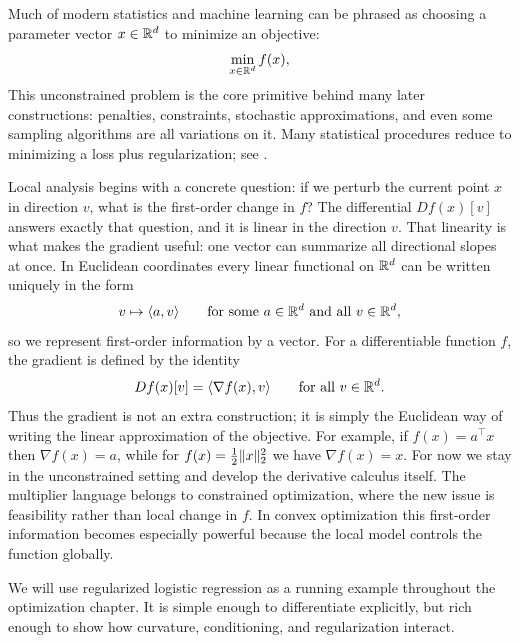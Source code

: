Much of modern statistics and machine learning can be phrased as choosing a parameter vector $x\in\mathbb{R}^d$ to minimize an objective:
\begin{equation}
  \min_{x \in \mathbb{R}^d} f(x),
  \label{eq:unconstrained-min}
\end{equation}
This unconstrained problem is the core primitive behind many later constructions: penalties, constraints, stochastic approximations, and even some sampling algorithms are all variations on it.
Many statistical procedures reduce to minimizing a loss plus regularization; see \citet[\S9.1]{boyd_vandenberghe_2004_convex}.

Local analysis begins with a concrete question: if we perturb the current point $x$ in direction $v$, what is the first-order change in $f$?
The differential $Df(x)[v]$ answers exactly that question, and it is linear in the direction $v$.
That linearity is what makes the gradient useful: one vector can summarize all directional slopes at once.
In Euclidean coordinates every linear functional on $\mathbb{R}^d$ can be written uniquely in the form
\[
  v \mapsto \langle a,v\rangle
  \qquad\text{for some } a\in\mathbb{R}^d \text{ and all } v\in\mathbb{R}^d,
\]
so we represent first-order information by a vector.
For a differentiable function $f$, the gradient is defined by the identity
\[
  Df(x)[v]=\langle\nabla f(x),v\rangle
  \qquad\text{for all } v\in\mathbb{R}^d.
\]
Thus the gradient is not an extra construction; it is simply the Euclidean way of writing the linear approximation of the objective.
For example, if $f(x)=a^\top x$ then $\nabla f(x)=a$, while for $f(x)=\frac12\lVert x\rVert_2^2$ we have $\nabla f(x)=x$.
For now we stay in the unconstrained setting and develop the derivative calculus itself.
The multiplier language belongs to constrained optimization, where the new issue is feasibility rather than local change in $f$.
In convex optimization this first-order information becomes especially powerful because the local model controls the function globally.

We will use regularized logistic regression as a running example throughout the optimization chapter.
It is simple enough to differentiate explicitly, but rich enough to show how curvature, conditioning, and regularization interact.

